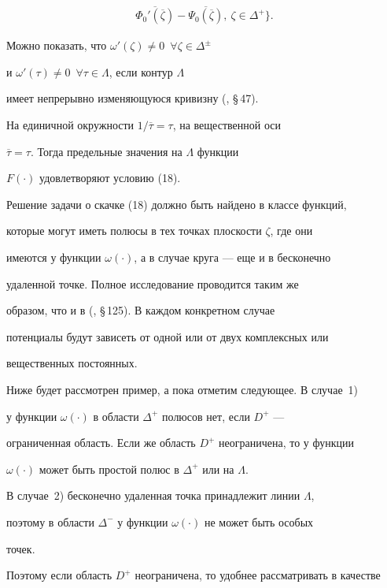 \begin{pf}
\begin{align*}
\overline{\Phi_0'(\overline{\zeta})}


- \overline{\Psi_0(\overline{\zeta})},\ \zeta\in\Delta^+ \bigg\} .


\end{align*}


Можно показать, что $\omega'(\zeta)\ne 0$\, $\forall\zeta\in\Delta^{\pm}$


и $\omega'(\tau)\ne 0$\, $\forall\tau\in\Lambda$, если контур $\Lambda$


имеет непрерывно изменяющуюся кривизну (\cite{Mush.MTU}, \S\,47).


На единичной окружности $1/\overline{\tau}=\tau$, на вещественной оси


$\overline{\tau}=\tau$. Тогда предельные значения на $\Lambda$ функции


$F(\cdot)$ удовлетворяют условию (18).


\end{pf}





Решение задачи о скачке (18) должно быть найдено в классе функций,


которые могут иметь полюсы в тех точках плоскости $\zeta$, где они


имеются у функции $\omega(\cdot)$, а в случае круга --- еще и в бесконечно


удаленной точке. Полное исследование проводится таким же


образом, что и в (\cite{Mush.MTU}, \S\,125). В каждом конкретном случае


потенциалы будут зависеть от одной или от двух комплексных или


вещественных постоянных.


Ниже будет рассмотрен пример, а пока отметим следующее. В случае~1)


у функции $\omega(\cdot)$ в области $\Delta^+$ полюсов нет, если $D^+$ ---


ограниченная область. Если же область $D^+$ неограничена, то у функции


$\omega(\cdot)$ может быть простой полюс в $\Delta^+$ или на $\Lambda$.


В случае~2) бесконечно удаленная точка принадлежит линии $\Lambda$,


поэтому в области $\Delta^-$ у функции $\omega(\cdot)$ не может быть особых


точек.


Поэтому если область $D^+$ неограничена, то удобнее рассматривать в качестве


